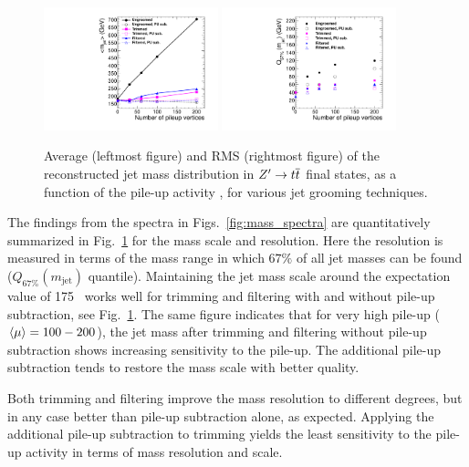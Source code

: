 \begin{figure} [htbx!]
\begin{center}
\includegraphics[width=0.45\textwidth]{AK10_mean_vsPU}
\includegraphics[width=0.45\textwidth]{AK10_rms_vsPU}
\caption[]{Average (leftmost figure) and RMS (rightmost figure) of the reconstructed jet mass distribution in $Z' \to t\overline{t}$ final states, as a function of the pile-up activity \axing, for various jet grooming techniques.}
\label{fig:mass_summary}
\end{center}
\end{figure}

The findings from the spectra in Figs.~\ref{fig:mass_spectra} are quantitatively summarized in Fig.~\ref{fig:mass_summary} for the mass scale and resolution. Here the resolution is measured in terms of the mass range in which $67\%$ of all jet masses can be found ($Q_{67\%}(m_{\mathrm{jet}})$ quantile).  
Maintaining the jet mass scale around the expectation value of 175~\GeV{} works well for trimming and filtering with and without pile-up subtraction, see Fig.~\ref{fig:mass_summary}. The same figure indicates that for very high pile-up ($\langle\mu\rangle = 100 - 200$), the jet mass after trimming and filtering without pile-up subtraction shows increasing sensitivity to the pile-up. The additional pile-up subtraction tends to restore the mass scale with better quality. 



Both trimming and filtering improve the mass resolution to different degrees, but in any case better than pile-up subtraction alone, as expected. Applying the additional pile-up subtraction to trimming yields the least sensitivity to the pile-up activity in terms of mass resolution and scale. 
%

